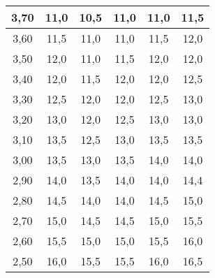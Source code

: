 \documentclass[a4paper,12pt,spanish]{article}
\begin{document}
\begin{longtable}[c]{c|ccccc|}
			\multicolumn{1}{|c|}{3,70} & \multicolumn{1}{c|}{11,0}   & \multicolumn{1}{c|}{10,5} & \multicolumn{1}{c|}{11,0} & \multicolumn{1}{c|}{11,0} & 11,5 \\ \hline
			\multicolumn{1}{|c|}{3,60} & \multicolumn{1}{c|}{11,5}   & \multicolumn{1}{c|}{11,0} & \multicolumn{1}{c|}{11,0} & \multicolumn{1}{c|}{11,5} & 12,0 \\ \hline
			\multicolumn{1}{|c|}{3,50} & \multicolumn{1}{c|}{12,0}   & \multicolumn{1}{c|}{11,0} & \multicolumn{1}{c|}{11,5} & \multicolumn{1}{c|}{12,0} & 12,0 \\ \hline
			\multicolumn{1}{|c|}{3,40} & \multicolumn{1}{c|}{12,0}   & \multicolumn{1}{c|}{11,5} & \multicolumn{1}{c|}{12,0} & \multicolumn{1}{c|}{12,0} & 12,5 \\ \hline
			\multicolumn{1}{|c|}{3,30} & \multicolumn{1}{c|}{12,5}   & \multicolumn{1}{c|}{12,0} & \multicolumn{1}{c|}{12,0} & \multicolumn{1}{c|}{12,5} & 13,0 \\ \hline
			\multicolumn{1}{|c|}{3,20} & \multicolumn{1}{c|}{13,0}   & \multicolumn{1}{c|}{12,0} & \multicolumn{1}{c|}{12,5} & \multicolumn{1}{c|}{13,0} & 13,0 \\ \hline
			\multicolumn{1}{|c|}{3,10} & \multicolumn{1}{c|}{13,5}   & \multicolumn{1}{c|}{12,5} & \multicolumn{1}{c|}{13,0} & \multicolumn{1}{c|}{13,5} & 13,5 \\ \hline
			\multicolumn{1}{|c|}{3,00} & \multicolumn{1}{c|}{13,5}   & \multicolumn{1}{c|}{13,0} & \multicolumn{1}{c|}{13,5} & \multicolumn{1}{c|}{14,0} & 14,0 \\ \hline
			\multicolumn{1}{|c|}{2,90} & \multicolumn{1}{c|}{14,0}   & \multicolumn{1}{c|}{13,5} & \multicolumn{1}{c|}{14,0} & \multicolumn{1}{c|}{14,0} & 14,4 \\ \hline
			\multicolumn{1}{|c|}{2,80} & \multicolumn{1}{c|}{14,5}   & \multicolumn{1}{c|}{14,0} & \multicolumn{1}{c|}{14,0} & \multicolumn{1}{c|}{14,5} & 15,0 \\ \hline
			\multicolumn{1}{|c|}{2,70} & \multicolumn{1}{c|}{15,0}   & \multicolumn{1}{c|}{14,5} & \multicolumn{1}{c|}{14,5} & \multicolumn{1}{c|}{15,0} & 15,5 \\ \hline
			\multicolumn{1}{|c|}{2,60} & \multicolumn{1}{c|}{15,5}   & \multicolumn{1}{c|}{15,0} & \multicolumn{1}{c|}{15,0} & \multicolumn{1}{c|}{15,5} & 16,0 \\ \hline
			\multicolumn{1}{|c|}{2,50} & \multicolumn{1}{c|}{16,0}   & \multicolumn{1}{c|}{15,5} & \multicolumn{1}{c|}{15,5} & \multicolumn{1}{c|}{16,0} & 16,5 \\ \hline

\end{longtable}
\end{document}
